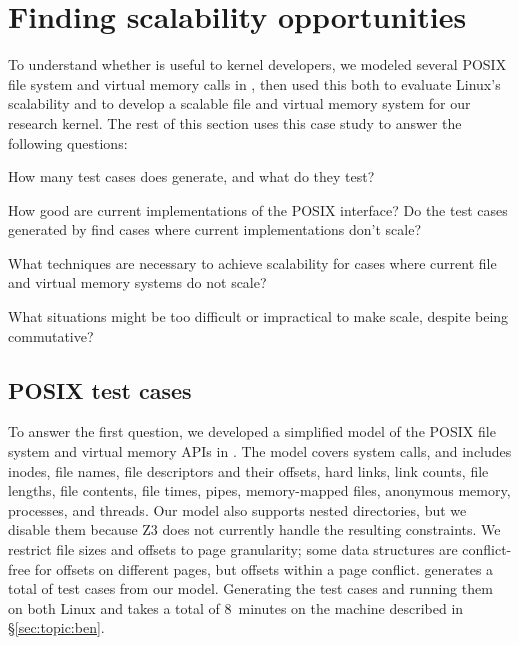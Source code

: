 \section{Finding scalability opportunities}
\label{sec:fs}

To understand whether \tool{} is useful to kernel developers,
we modeled several POSIX file system and virtual memory calls in \tool,
then used this both to evaluate Linux's scalability and to develop a
scalable file and virtual memory system for our \sys research kernel.
%
The rest of this section uses this case study to answer the following
questions:

\begin{CompactItemize}

\item How many test cases does \tool{} generate, and what do they test?

\item How good are current implementations of the POSIX interface?
      Do the test cases generated by \tool{} find
      cases where current implementations don't scale?

\item What techniques are necessary to achieve scalability for
      cases where current file and virtual memory systems do not
      scale?

\item What situations might be too difficult or impractical to
      make scale, despite being commutative?

\end{CompactItemize}

\subsection{POSIX test cases}

To answer the first question, we developed a simplified model of the
POSIX file system and virtual memory APIs in \tool{}.  The model covers
 system
calls, and includes inodes, file
names, file descriptors and their offsets, hard links, link counts,
file lengths, file contents, file times, pipes, memory-mapped files,
anonymous memory, processes, and threads.  Our model
also supports nested
directories, but we disable them because Z3 does not currently handle
the resulting constraints.
%
We restrict file sizes and offsets to page granularity; some \sys data
structures are conflict-free for offsets on different pages, but
offsets within a page conflict.
%
\tool generates a total of  test cases
from our model.
%
Generating the test cases and running them on both Linux and \sys
takes a total of 8~minutes on the machine described in
\S\ref{sec:topic:ben}.

